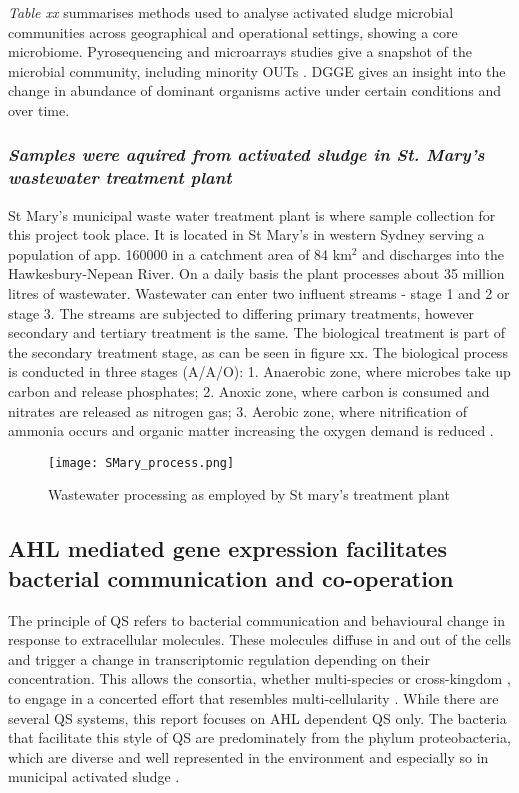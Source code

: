 \documentclass[11pt]{article}
\begin{document}
\emph{Table xx} summarises methods used to analyse activated sludge microbial communities across geographical and operational settings, showing a core microbiome. Pyrosequencing and microarrays studies give a snapshot of the microbial community, including minority OUTs \cite{ranasinghe2012revealing}. DGGE gives an insight into the change in abundance of dominant organisms active under certain conditions and over time. 

\subsubsection{\emph{Samples were aquired from activated sludge in St. Mary's wastewater treatment plant}}
St Mary's municipal waste water treatment plant is where sample collection for this project took place. It is located in St Mary's in western Sydney serving a population of app. 160000 in a catchment area of 84 km$^{2}$ and discharges into the Hawkesbury-Nepean River. On a daily basis the plant processes about 35 million litres of wastewater. Wastewater can enter two influent streams - stage 1 and 2 or stage 3. The streams are subjected to differing primary treatments, however secondary and tertiary treatment is the same. The biological treatment is part of the secondary treatment stage, as can be seen in figure xx. The biological process is conducted in three stages (A/A/O): 1. Anaerobic zone, where microbes take up carbon and release phosphates; 2. Anoxic zone, where carbon is consumed and nitrates are released as nitrogen gas; 3. Aerobic zone, where nitrification of ammonia occurs and organic matter increasing the oxygen demand is reduced \cite{stmarys}.
\begin{figure}
\texttt{[image: SMary\_process.png]}
\caption{Wastewater processing as employed by St mary's treatment plant \cite{stmarys}}
\end{figure}

\subsection{AHL mediated gene expression facilitates bacterial communication and co-operation}
The principle of QS refers to bacterial communication and behavioural change in response to extracellular molecules. These molecules diffuse in and out of the cells and trigger a change in transcriptomic regulation depending on their concentration. This allows the consortia, whether multi-species or cross-kingdom \citep{williams2007quorum}, to engage in a concerted effort that resembles multi-cellularity \cite{kjelleberg2002}. While there are several QS systems, this report focuses on AHL dependent QS only. The bacteria that facilitate this style of QS are predominately from the phylum proteobacteria, which are diverse and well represented in the environment and especially so in municipal activated sludge \cite{Hesham_11,Wagner_02}.  
\end{document}
